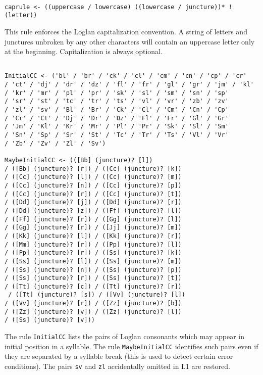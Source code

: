 \documentclass[12pt]{article}
\begin{document}
\begin{verbatim}

caprule <- ((uppercase / lowercase) ((lowercase / juncture))* !(letter))

\end{verbatim}

This rule enforces the Loglan capitalization convention.  A string of letters and junctures unbroken by any other
characters will contain an uppercase letter only at the beginning.  Capitalization is always optional.

\begin{verbatim}

InitialCC <- ('bl' / 'br' / 'ck' / 'cl' / 'cm' / 'cn' / 'cp' / 'cr' 
/ 'ct' / 'dj' / 'dr' / 'dz' / 'fl' / 'fr' / 'gl' / 'gr' / 'jm' / 'kl' 
/ 'kr' / 'mr' / 'pl' / 'pr' / 'sk' / 'sl' / 'sm' / 'sn' / 'sp' 
/ 'sr' / 'st' / 'tc' / 'tr' / 'ts' / 'vl' / 'vr' / 'zb' / 'zv' 
/ 'zl' / 'sv' / 'Bl' / 'Br' / 'Ck' / 'Cl' / 'Cm' / 'Cn' / 'Cp' 
/ 'Cr' / 'Ct' / 'Dj' / 'Dr' / 'Dz' / 'Fl' / 'Fr' / 'Gl' / 'Gr' 
/ 'Jm' / 'Kl' / 'Kr' / 'Mr' / 'Pl' / 'Pr' / 'Sk' / 'Sl' / 'Sm' 
/ 'Sn' / 'Sp' / 'Sr' / 'St' / 'Tc' / 'Tr' / 'Ts' / 'Vl' / 'Vr' 
/ 'Zb' / 'Zv' / 'Zl' / 'Sv')

MaybeInitialCC <- (([Bb] (juncture)? [l]) 
/ ([Bb] (juncture)? [r]) / ([Cc] (juncture)? [k]) 
/ ([Cc] (juncture)? [l]) / ([Cc] (juncture)? [m]) 
/ ([Cc] (juncture)? [n]) / ([Cc] (juncture)? [p]) 
/ ([Cc] (juncture)? [r]) / ([Cc] (juncture)? [t]) 
/ ([Dd] (juncture)? [j]) / ([Dd] (juncture)? [r]) 
/ ([Dd] (juncture)? [z]) / ([Ff] (juncture)? [l]) 
/ ([Ff] (juncture)? [r]) / ([Gg] (juncture)? [l]) 
/ ([Gg] (juncture)? [r]) / ([Jj] (juncture)? [m]) 
/ ([Kk] (juncture)? [l]) / ([Kk] (juncture)? [r]) 
/ ([Mm] (juncture)? [r]) / ([Pp] (juncture)? [l]) 
/ ([Pp] (juncture)? [r]) / ([Ss] (juncture)? [k]) 
/ ([Ss] (juncture)? [l]) / ([Ss] (juncture)? [m]) 
/ ([Ss] (juncture)? [n]) / ([Ss] (juncture)? [p]) 
/ ([Ss] (juncture)? [r]) / ([Ss] (juncture)? [t]) 
/ ([Tt] (juncture)? [c]) / ([Tt] (juncture)? [r])
 / ([Tt] (juncture)? [s]) / ([Vv] (juncture)? [l]) 
/ ([Vv] (juncture)? [r]) / ([Zz] (juncture)? [b]) 
/ ([Zz] (juncture)? [v]) / ([Zz] (juncture)? [l]) 
/ ([Ss] (juncture)? [v]))

\end{verbatim}

The rule {\tt InitialCC} lists the pairs of Loglan consonants which may appear in initial position in a syllable.  The rule
{\tt MaybeInitialCC} identifies such pairs even if they are separated by a syllable break (this is used to detect certain error conditions).  The pairs {\tt sv} and {\tt zl} accidentally omitted in L1 are restored.
\end{document}
